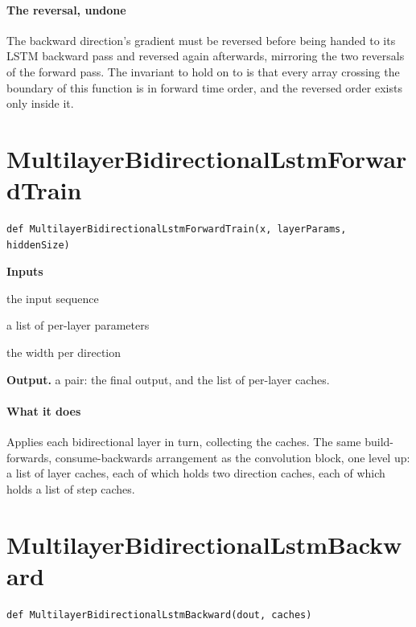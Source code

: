 \paragraph{The reversal, undone}
The backward direction's gradient must be reversed before being handed to its LSTM backward pass and reversed again afterwards, mirroring the two reversals of the forward pass. The invariant to hold on to is that every array crossing the boundary of this function is in forward time order, and the reversed order exists only inside it.


\section{MultilayerBidirectionalLstmForwardTrain}
\begin{lstlisting}[style=sig]
def MultilayerBidirectionalLstmForwardTrain(x, layerParams, hiddenSize)
\end{lstlisting}

\noindent\textbf{Inputs}
\begin{description}[leftmargin=2.2em,style=nextline,font=\normalfont\ttfamily]\setlength\itemsep{1pt}
  \item[{x}] \normalfont the input sequence
  \item[{layerParams}] \normalfont a list of per-layer parameters
  \item[{hiddenSize}] \normalfont the width per direction
\end{description}

\noindent\textbf{Output.} a pair: the final output, and the list of per-layer caches.


\paragraph{What it does}
Applies each bidirectional layer in turn, collecting the caches. The same build-forwards, consume-backwards arrangement as the convolution block, one level up: a list of layer caches, each of which holds two direction caches, each of which holds a list of step caches.


\section{MultilayerBidirectionalLstmBackward}
\begin{lstlisting}[style=sig]
def MultilayerBidirectionalLstmBackward(dout, caches)
\end{lstlisting}

